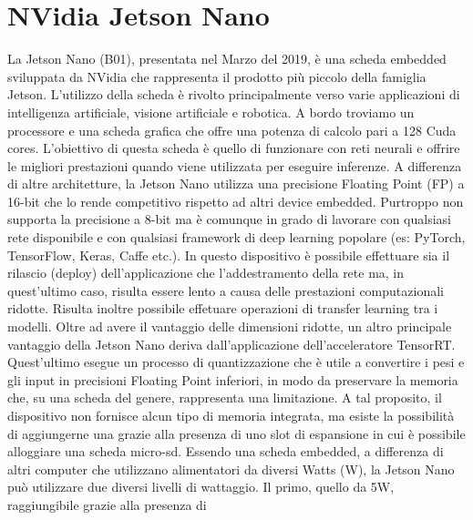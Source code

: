 \section{NVidia Jetson Nano}
La Jetson Nano (B01), presentata nel Marzo del 2019, è una scheda embedded 
sviluppata da NVidia che rappresenta il prodotto più piccolo della 
famiglia Jetson. L'utilizzo della scheda è rivolto principalmente verso varie 
applicazioni di intelligenza artificiale, visione artificiale e robotica. A bordo 
troviamo un processore e una scheda grafica che offre una potenza di calcolo 
pari a 128 Cuda cores. L'obiettivo di questa scheda è quello di funzionare 
con reti neurali e offrire le migliori prestazioni quando viene utilizzata per 
eseguire inferenze. A differenza di altre architetture, la Jetson Nano utilizza 
una precisione Floating Point (FP) a 16-bit che lo rende competitivo rispetto 
ad altri device embedded. Purtroppo non supporta la precisione a 8-bit 
ma è comunque in grado di lavorare con qualsiasi rete disponibile e con 
qualsiasi framework di deep learning popolare (es: PyTorch, TensorFlow, 
Keras, Caffe etc.). In questo dispositivo è possibile effettuare sia il rilascio 
(deploy) dell'applicazione che l'addestramento della rete ma, in quest'ultimo 
caso, risulta essere lento a causa delle prestazioni computazionali ridotte. 
Risulta inoltre possibile effetuare operazioni di transfer learning tra i modelli.
Oltre ad avere il vantaggio delle dimensioni ridotte, un altro principale vantaggio 
della Jetson Nano deriva dall'applicazione dell'acceleratore TensorRT. 
Quest'ultimo esegue un processo di quantizzazione che è utile a convertire i 
pesi e gli input in precisioni Floating Point inferiori, in modo da preservare 
la memoria che, su una scheda del genere, rappresenta una limitazione. A 
tal proposito, il dispositivo non fornisce alcun tipo di memoria integrata, 
ma esiste la possibilità di aggiungerne una grazie alla presenza di uno slot 
di espansione in cui è possibile alloggiare una scheda micro-sd. Essendo una 
scheda embedded, a differenza di altri computer che utilizzano alimentatori 
da diversi Watts (W), la Jetson Nano può utilizzare due diversi livelli di 
wattaggio. Il primo, quello da 5W, raggiungibile grazie alla presenza di 
